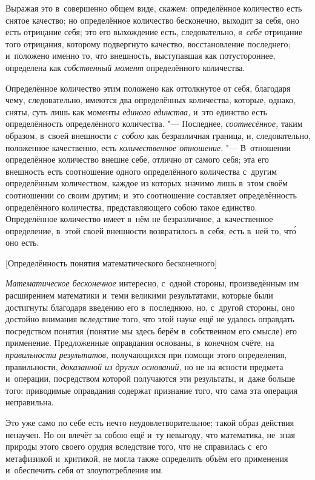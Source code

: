 Выражая это в~совершенно общем виде, скажем: определённое количество есть
снятое качество; но определённое количество бесконечно, выходит за себя, оно
есть отрицание себя; это его выхождение есть, следовательно, {\em в~себе}
отрицание того отрицания, которому подвергнуто качество, восстановление
последнего; и~положено именно то, что внешность, выступавшая как потустороннее,
определена как {\em собственный момент} определённого количества.

Определённое количество этим положено как оттолкнутое от себя, благодаря чему,
следовательно, имеются два определённых количества, которые, однако, сняты,
суть лишь как моменты {\em единого единства,} и~это единство есть
определённость определённого количества. "--- Последнее, {\em соотнесённое,}
таким образом, в~своей внешности {\em с~собою} как безразличная граница, и,
следовательно, положенное качественно, есть {\em количественное отношение}.
"--- В~отношении определённое количество внешне себе, отлично от самого себя;
эта его внешность есть соотношение одного определённого количества с~другим
определённым количеством, каждое из которых значимо лишь в~этом своём
соотношении со своим другим; и~это соотношение составляет определённость
определённого количества, представляющего собою такое единство. Определённое
количество имеет в~нём не безразличное, а~качественное определение, в~этой
своей внешности возвратилось в~себя, есть в~ней то, чт\'{о} оно есть.

%
{[Определённость понятия математического бесконечного]}

{\em Математическое бесконечное} интересно, с~одной стороны, произведённым им
расширением математики и~теми великими результатами, которые были достигнуты
благодаря введению его в~последнюю, но, с~другой стороны, оно достойно внимания
вследствие того, что этой науке ещё не удалось оправдать посредством понятия
(понятие мы здесь берём в~собственном его смысле) его применение. Предложенные
оправдания основаны, в~конечном счёте, на {\em правильности результатов,}
получающихся при помощи этого определения, правильности,
{\em доказанной из других оснований,} но не на ясности предмета и~операции,
посредством которой получаются эти результаты, и~даже больше того: приводимые
оправдания содержат признание того, что сама эта операция неправильна.

Это уже само по себе есть нечто неудовлетворительное; такой образ действия
ненаучен. Но он влечёт за собою ещё и~ту невыгоду, что математика, не~зная
природы этого своего орудия вследствие того, что не справилась с~его
метафизикой и~критикой, не могла также определить объём его применения
и~обеспечить себя от злоупотребления им.

